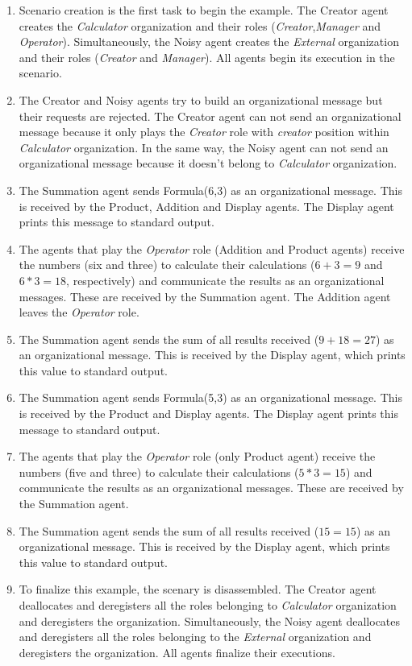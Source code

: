 \begin{enumerate}
\item Scenario creation is the first task to begin the example. The Creator agent creates the \textit{Calculator}   organization and their roles (\textit{Creator},\textit{Manager} and \textit{Operator}). Simultaneously,   the Noisy agent creates the \textit{External} organization and their roles (\textit{Creator} and \textit{Manager}). All agents begin its execution in the scenario.
\item The Creator and Noisy agents try to build an organizational message but their requests are rejected.   The Creator agent can not send an organizational message because it only plays the \textit{Creator}
  role with \textit{creator} position within \textit{Calculator} organization. In the same way, the Noisy
  agent can not send an organizational message because it doesn't belong to \textit{Calculator} organization.
\item The Summation agent sends Formula(6,3) as an organizational message. This is received by the Product,
  Addition and Display agents. The Display agent prints this message to standard output.
\item The agents that play the \textit{Operator} role (Addition and Product agents) receive the numbers
  (six and three) to calculate their calculations ($6+3=9$ and $6*3=18$, respectively) and communicate
  the results as an organizational messages. These are received by the Summation agent. The Addition agent
  leaves the \textit{Operator} role.
\item The Summation agent sends the sum of all results received ($9+18=27$) as an organizational message.
  This is received by the Display agent, which prints this value to standard output.
\item The Summation agent sends Formula(5,3) as an organizational message. This is received by the Product
  and Display agents. The Display agent prints this message to standard output.
\item The agents that play the \textit{Operator} role (only Product agent) receive the numbers (five and three)
  to calculate their calculations ($5*3=15$) and communicate the results as an organizational messages. These
  are received by the Summation agent.
\item The Summation agent sends the sum of all results received ($15=15$) as an organizational message. This
  is received by the Display agent, which prints this value to standard output.
\item To finalize this example, the scenary is disassembled. The Creator agent deallocates and deregisters
  all the roles belonging to \textit{Calculator} organization and deregisters the organization. Simultaneously,
  the Noisy agent deallocates and deregisters all the roles belonging to the \textit{External} organization and
  deregisters the organization. All agents finalize their executions.
\end{enumerate}

